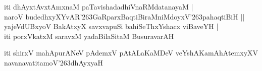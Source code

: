 \documentclass[twoside,12pt,openright]{book}
\def\S{\char'263}
\newcounter{shloka}[chapter]
\begin{document}
\begin{shloka}%
iti dhAyxtAvxtAmxnaM paTavishadadhiVnaRMdatanayaM |\\
naroV budedhxyXYvAR\S GaRparxBaqtiBiraMniMdoyxV\S pahaqtiBiH ||\\
yajeVdUBxyoV BakAtxyX savxvapuSi bahiSeThxYshacx viBaveYH |\\
iti porxVkatxM saravxM yadaBilaSitaM BusuravarAH 
\end{shloka}

\begin{center}
iti shirxV mahApurANeV pAdemxV pAtALaKaMDeV veYshAKamAhAtemxyXV 
navanavatitamoV\S dhAyxyaH
\end{center}
\end{document}
